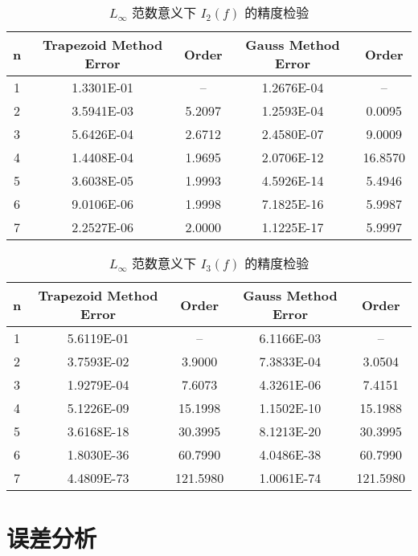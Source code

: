\documentclass{ctexart}
\begin{document}
	\begin{table}[H]
		\centering
		\bigskip
		\begin{small}
			\begin{tabular}{|c|cc|cc|}
				\hline
				n & Trapezoid Method Error & Order & Gauss Method Error & Order\\
				\hline
				1 & 1.3301E-01 & -- & 1.2676E-04 & --\\
				2 & 3.5941E-03 & 5.2097 & 1.2593E-04 & 0.0095\\
				3 & 5.6426E-04 & 2.6712 & 2.4580E-07 & 9.0009\\
				4 & 1.4408E-04 & 1.9695 & 2.0706E-12 & 16.8570\\
				5 & 3.6038E-05 & 1.9993 & 4.5926E-14 & 5.4946\\
				6 & 9.0106E-06 & 1.9998 & 7.1825E-16 & 5.9987\\
				7 & 2.2527E-06 & 2.0000 & 1.1225E-17 & 5.9997\\
				\hline
			\end{tabular}
		\end{small}
		\caption{\label{table2.label} $L_\infty$ 范数意义下 $I_2(f)$ 的精度检验} 
	\end{table}
	
	\begin{table}[H]
		\centering
		\bigskip
		\begin{small}
			\begin{tabular}{|c|cc|cc|}
				\hline
				n & Trapezoid Method Error & Order & Gauss Method Error & Order\\
				\hline
				1 & 5.6119E-01 & -- & 6.1166E-03 & --\\
				2 & 3.7593E-02 & 3.9000 & 7.3833E-04 & 3.0504\\
				3 & 1.9279E-04 & 7.6073 & 4.3261E-06 & 7.4151\\
				4 & 5.1226E-09 & 15.1998 & 1.1502E-10 & 15.1988\\
				5 & 3.6168E-18 & 30.3995 & 8.1213E-20 & 30.3995\\
				6 & 1.8030E-36 & 60.7990 & 4.0486E-38 & 60.7990\\
				7 & 4.4809E-73 & 121.5980 & 1.0061E-74 & 121.5980\\
				\hline
			\end{tabular}
		\end{small}
		\caption{\label{table3.label} $L_\infty$ 范数意义下 $I_3(f)$ 的精度检验} 
	\end{table}

\section*{误差分析}
	
\end{document}
